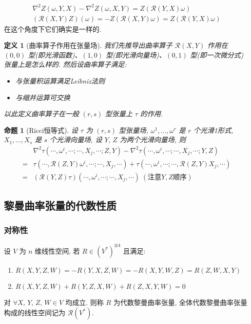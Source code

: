 \documentclass{book}
\newtheorem{definition}[theorem]{\indent 定义}
\newtheorem{proposition}[theorem]{\indent 命题}
\begin{document}
    \begin{gather*}
        \nabla^2Z(\omega,Y,X) - \nabla^2Z(\omega,X,Y) = Z(\mathcal{R}(Y,X)\omega) \\
        (\mathcal{R}(X,Y)Z)(\omega) = -Z(\mathcal{R}(X,Y)\omega) = Z(\mathcal{R}(Y,X)\omega)
    \end{gather*}
    在这个角度下它们确实是一样的.
    \begin{definition}[曲率算子作用在张量场]
        我们先推导出曲率算子 $\mathcal{R}(X,Y)$ 作用在 $(0,0)$ 型(即光滑函数)、$(1,0)$ 型(即光滑向量场)、$(0,1)$ 型(即一次微分式)张量上是怎么样的. 然后设曲率算子满足:
        \begin{itemize}
            \item 与张量积运算满足Leibniz法则
            \item 与缩并运算可交换
        \end{itemize}
        以此定义曲率算子在一般 $(r,s)$ 型张量上 $\tau$ 的作用.
    \end{definition}
    \begin{proposition}[Ricci恒等式]
        设 $\tau$ 为 $(r,s)$ 型张量场, $\omega^1,\dots,\omega^r$ 是 $r$ 个光滑1形式, $X_1,\dots,X_s$ 是 $s$ 个光滑向量场, 设 $Y,\,Z$ 为两个光滑向量场, 则
        \begin{align*}
            & \nabla^2\tau(\cdots,\omega^i,\cdots;\cdots,X_j,\cdots;Z,Y) - \nabla^2\tau(\cdots,\omega^i,\cdots;\cdots,X_j,\cdots;Y,Z) \\
            =& \tau(\cdots,\mathcal{R}(Z,Y)\omega^i,\cdots;\cdots,X_j,\cdots) + \tau(\cdots,\omega^i,\cdots;\cdots,\mathcal{R}(Z,Y)X_j,\cdots) \\
            =&(\mathcal{R}(Y,Z)\tau)(\cdots,\omega^i,\cdots;\cdots,X_j,\cdots) \;(\text{注意}Y,Z\text{顺序})
        \end{align*}
    \end{proposition}

    \subsection{黎曼曲率张量的代数性质}
    \subsubsection{对称性}
        设 $V$ 为 $n$ 维线性空间, 若 $R\in(V^*)^{\otimes4}$ 且满足:
        \begin{enumerate}
            \item $R(X,Y,Z,W) = -R(Y,X,Z,W) = -R(X,Y,W,Z) = R(Z,W,X,Y)$
            \item $R(X,Y,Z,W) + R(Y,Z,X,W) + R(Z,X,Y,W) = 0$
        \end{enumerate} 对 $\forall X,\,Y,\,Z,\,W\in V$ 均成立.
        则称 $R$ 为代数黎曼曲率张量, 全体代数黎曼曲率张量构成的线性空间记为 $\mathcal{R}(V^*)$.
\end{document}
